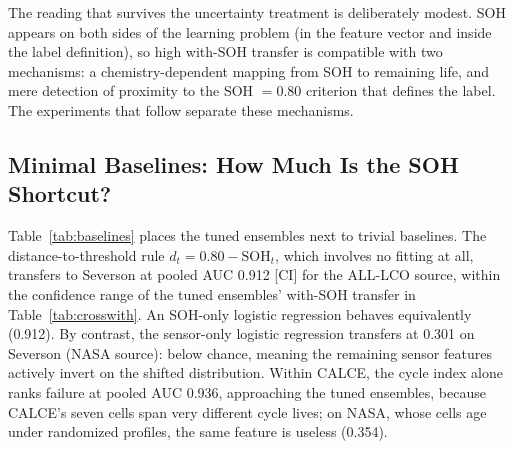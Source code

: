 \documentclass[IJPHM, 2014, 00]{PHMSociety}
\begin{document}
\begin{table}[!t]
\caption{GRU Transfer at H=20 on the Common Feature Set: Seed-Averaged Per-Cell AUC ($\pm$ SD Over Seeds 42, 1, 7).}
\label{tab:gru}
\centering
\small
{}
\end{table}

The reading that survives the uncertainty treatment is deliberately modest. SOH appears on both sides of the learning problem (in the feature vector and inside the label definition), so high with-SOH transfer is compatible with two mechanisms: a chemistry-dependent mapping from SOH to remaining life, and mere detection of proximity to the SOH $=0.80$ criterion that defines the label. The experiments that follow separate these mechanisms.

\subsection{Minimal Baselines: How Much Is the SOH Shortcut?}
Table~\ref{tab:baselines} places the tuned ensembles next to trivial baselines. The distance-to-threshold rule $d_t = 0.80 - \mathrm{SOH}_t$, which involves no fitting at all, transfers to Severson at pooled AUC 0.912 [CI] for the ALL-LCO source, within the confidence range of the tuned ensembles' with-SOH transfer in Table~\ref{tab:crosswith}. An SOH-only logistic regression behaves equivalently (0.912). By contrast, the sensor-only logistic regression transfers at 0.301 on Severson (NASA source): below chance, meaning the remaining sensor features actively invert on the shifted distribution. Within CALCE, the cycle index alone ranks failure at pooled AUC 0.936, approaching the tuned ensembles, because CALCE's seven cells span very different cycle lives; on NASA, whose cells age under randomized profiles, the same feature is useless (0.354).
\end{document}
